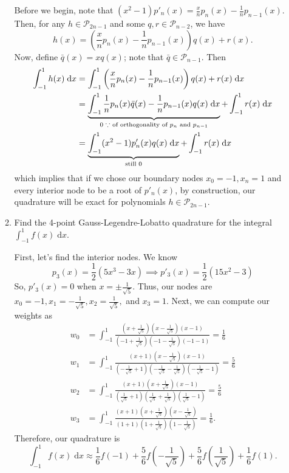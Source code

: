 \documentclass[a4paper,12pt]{article}
\newcommand{\pols}{\mathcal{P}}
\newcommand{\dd}[1]{\mathrm{d}#1}
\begin{document}
\begin{enumerate}[label = \arabic*.]
\begin{enumerate}[label = (\roman*)]
				Before we begin, note that $ (x^2 - 1)p'_n(x) = \frac{x}{n}p_n(x) - \frac{1}{n}p_{n-1}(x) $. Then, for any $ h \in \pols_{2n - 1} $ and some $ q,r \in \pols_{n - 2} $, we have
				\[
					h(x) = \left(\frac{x}{n}p_n(x) - \frac{1}{n}p_{n-1}(x)\right) q(x) + r(x).
				\]
				Now, define $ \bar{q}(x) = x q(x) $; note that $ \bar{q} \in \pols_{n - 1} $. Then
				\begin{align*}
					\int_{-1}^{1} h(x) \;\dd x &= \int_{-1}^{1} \left(\frac{x}{n}p_n(x) - \frac{1}{n}p_{n-1}(x)\right) q(x) + r(x) \;\dd x \\
					&= \underbrace{\int_{-1}^{1} \frac{1}{n}p_n(x) \bar{q}(x) - \frac{1}{n}p_{n-1}(x) q(x) \;\dd x}_{\text{0 $ \because $ of orthogonality of $ p_n $ and $ p_{n - 1} $}} + \int_{-1}^{1} r(x) \;\dd x \\
					&= \underbrace{\int_{-1}^{1} (x^2 - 1)p'_n(x) q(x) \;\dd x}_{\text{still 0}} + \int_{-1}^{1} r(x) \;\dd x \\
				\end{align*}
				which implies that if we chose our boundary nodes $ x_0 = -1, x_n = 1 $ and every interior node to be a root of $ p'_n(x) $, by construction, our quadrature will be exact for polynomials $ h \in \pols_{2n - 1} $.
			
				\item Find the 4-point Gauss-Legendre-Lobatto quadrature for the integral $ \int_{-1}^{1} f(x) \;\dd x $.
				
				First, let's find the interior nodes. We know 
				\[
					p_3(x) = \frac{1}{2} (5x^3 - 3x) \implies p'_3(x) = \frac{1}{2} (15 x^2 - 3)
				\]	
				So, $ p'_3(x) = 0 $ when $ x = \pm \frac{1}{\sqrt{5}} $. Thus, our nodes are $ x_0 = -1, x_1 = -\frac{1}{\sqrt{5}}, x_2 = \frac{1}{\sqrt{5}}, $ and $ x_3 = 1 $. Next, we can compute our weights as
				\begin{align*}
					w_0 &= \int_{-1}^{1} \frac{\left(x + \frac{1}{\sqrt{5}}\right) \left(x - \frac{1}{\sqrt{5}}\right) (x - 1)}{\left(-1 + \frac{1}{\sqrt{5}}\right) \left(-1 - \frac{1}{\sqrt{5}}\right) (-1 - 1)} = \frac{1}{6} \\
					w_1 &= \int_{-1}^{1} \frac{(x + 1) \left(x - \frac{1}{\sqrt{5}}\right) (x - 1)}{\left(-\frac{1}{\sqrt{5}} + 1\right) \left(-\frac{1}{\sqrt{5}} - \frac{1}{\sqrt{5}}\right) \left(-\frac{1}{\sqrt{5}} - 1\right)} = \frac{5}{6} \\
					w_2 &= \int_{-1}^{1} \frac{(x + 1) \left(x + \frac{1}{\sqrt{5}}\right) (x - 1)}{\left(\frac{1}{\sqrt{5}} + 1\right) \left(\frac{1}{\sqrt{5}} + \frac{1}{\sqrt{5}}\right) \left(\frac{1}{\sqrt{5}} - 1\right)} = \frac{5}{6} \\
					w_3 &= \int_{-1}^{1} \frac{(x + 1) \left(x + \frac{1}{\sqrt{5}}\right) \left(x - \frac{1}{\sqrt{5}}\right)}{(1 + 1) \left(1 + \frac{1}{\sqrt{5}}\right) \left(1 - \frac{1}{\sqrt{5}}\right)} = \frac{1}{6}.
				\end{align*}
				Therefore, our quadrature is
				\[
					\boxed{\int_{-1}^{1} f(x) \;\dd x \approx \frac{1}{6} f(-1) + \frac{5}{6} f\left(-\frac{1}{\sqrt{5}}\right) + \frac{5}{6} f\left(\frac{1}{\sqrt{5}}\right) + \frac{1}{6} f(1).}
				\]
			\end{enumerate} 
\end{enumerate}
\end{document}
